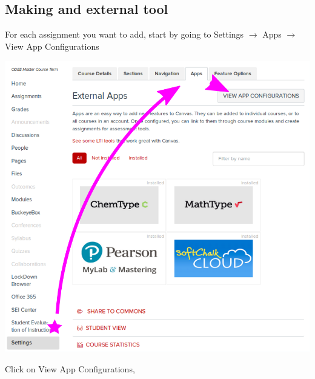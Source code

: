 \documentclass{ximera}
\begin{document}
\subsection{Making and external tool}

For each assignment you want to add, start by going to Settings $\to$  Apps $\to$ View App Configurations

\begin{image}
\includegraphics{canvas1.png}
\end{image}
Click on View App Configurations, 
\end{document}
